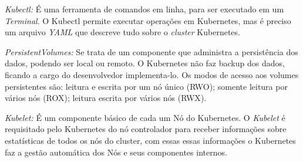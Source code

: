 \textit{Kubectl:} É uma ferramenta de comandos em linha, para ser executado em um \textit{Terminal}. O Kubectl permite executar operações em Kubernetes, mas é preciso um arquivo \textit{YAML} que descreve tudo sobre o \textit{cluster} Kubernetes.


\textit{PersistentVolumes:} Se trata de um componente que administra a persistência dos dados, podendo ser local ou remoto. O Kubernetes não faz backup dos dados, ficando a cargo do desenvolvedor implementa-lo. Os modos de acesso aos volumes persistentes são: leitura e escrita por um nó único (\gls{RWO}); somente leitura por vários nós (\gls{ROX}); leitura escrita por vários nós (\gls{RWX}).





\textit{Kubelet:} É um componente básico de cada um Nó do Kubernetes. O \textit{Kubelet} é requisitado pelo Kubernetes do nó controlador para receber informações sobre estatísticas de todos os nós do cluster, com essas essas informações o Kubernetes faz a gestão automática dos Nós e seus componentes internos.


